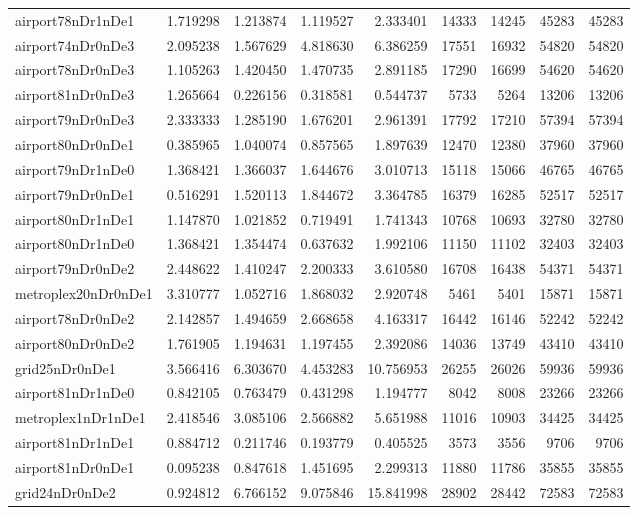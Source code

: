 \begin{longtable}{|l|r|r|r|r|r|r|r|r|}
airport78nDr1nDe1 & 1.719298 & 1.213874 & 1.119527 & 2.333401 & 14333 & 14245 & 45283 & 45283 \\
airport74nDr0nDe3 & 2.095238 & 1.567629 & 4.818630 & 6.386259 & 17551 & 16932 & 54820 & 54820 \\
airport78nDr0nDe3 & 1.105263 & 1.420450 & 1.470735 & 2.891185 & 17290 & 16699 & 54620 & 54620 \\
airport81nDr0nDe3 & 1.265664 & 0.226156 & 0.318581 & 0.544737 & 5733 & 5264 & 13206 & 13206 \\
airport79nDr0nDe3 & 2.333333 & 1.285190 & 1.676201 & 2.961391 & 17792 & 17210 & 57394 & 57394 \\
airport80nDr0nDe1 & 0.385965 & 1.040074 & 0.857565 & 1.897639 & 12470 & 12380 & 37960 & 37960 \\
airport79nDr1nDe0 & 1.368421 & 1.366037 & 1.644676 & 3.010713 & 15118 & 15066 & 46765 & 46765 \\
airport79nDr0nDe1 & 0.516291 & 1.520113 & 1.844672 & 3.364785 & 16379 & 16285 & 52517 & 52517 \\
airport80nDr1nDe1 & 1.147870 & 1.021852 & 0.719491 & 1.741343 & 10768 & 10693 & 32780 & 32780 \\
airport80nDr1nDe0 & 1.368421 & 1.354474 & 0.637632 & 1.992106 & 11150 & 11102 & 32403 & 32403 \\
airport79nDr0nDe2 & 2.448622 & 1.410247 & 2.200333 & 3.610580 & 16708 & 16438 & 54371 & 54371 \\
metroplex20nDr0nDe1 & 3.310777 & 1.052716 & 1.868032 & 2.920748 & 5461 & 5401 & 15871 & 15871 \\
airport78nDr0nDe2 & 2.142857 & 1.494659 & 2.668658 & 4.163317 & 16442 & 16146 & 52242 & 52242 \\
airport80nDr0nDe2 & 1.761905 & 1.194631 & 1.197455 & 2.392086 & 14036 & 13749 & 43410 & 43410 \\
grid25nDr0nDe1 & 3.566416 & 6.303670 & 4.453283 & 10.756953 & 26255 & 26026 & 59936 & 59936 \\
airport81nDr1nDe0 & 0.842105 & 0.763479 & 0.431298 & 1.194777 & 8042 & 8008 & 23266 & 23266 \\
metroplex1nDr1nDe1 & 2.418546 & 3.085106 & 2.566882 & 5.651988 & 11016 & 10903 & 34425 & 34425 \\
airport81nDr1nDe1 & 0.884712 & 0.211746 & 0.193779 & 0.405525 & 3573 & 3556 & 9706 & 9706 \\
airport81nDr0nDe1 & 0.095238 & 0.847618 & 1.451695 & 2.299313 & 11880 & 11786 & 35855 & 35855 \\
grid24nDr0nDe2 & 0.924812 & 6.766152 & 9.075846 & 15.841998 & 28902 & 28442 & 72583 & 72583 \\

\end{longtable}
